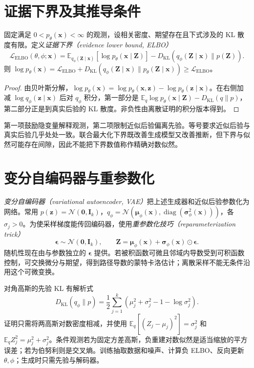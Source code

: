 \section{证据下界及其推导条件}
\begin{proposition}[ELBO 分解]
固定满足 $0<p_\theta(\mathbf x)<\infty$ 的观测，设相关密度、期望存在且下式涉及的 KL 散度有限。定义\emph{证据下界（evidence lower bound, ELBO）}
\begin{equation}
\mathcal L_{\mathrm{ELBO}}(\theta,\phi;\mathbf x)
=\mathbb E_{q_\phi(\mathbf Z\mid\mathbf x)}[\log p_\theta(\mathbf x\mid\mathbf Z)]
-D_{\mathrm{KL}}(q_\phi(\mathbf Z\mid\mathbf x)\|p(\mathbf Z)).
\label{eq:dl-elbo}
\end{equation}
则 $\log p_\theta(\mathbf x)=\mathcal L_{\mathrm{ELBO}}+D_{\mathrm{KL}}(q_\phi(\mathbf Z\mid\mathbf x)\|p_\theta(\mathbf Z\mid\mathbf x))\geq\mathcal L_{\mathrm{ELBO}}$。
\end{proposition}
\begin{proof}
由贝叶斯分解，$\log p_\theta(\mathbf x)=\log p_\theta(\mathbf x,\mathbf z)-\log p_\theta(\mathbf z\mid\mathbf x)$。在右侧加减 $\log q_\phi(\mathbf z\mid\mathbf x)$ 后对 $q_\phi$ 积分，第一部分是 $\mathbb E_q\log p_\theta(\mathbf x\mid\mathbf Z)-D_{\mathrm{KL}}(q\|p)$，第二部分正是到真实后验的 KL 散度。非负性由离散证明的积分版本得到。
\end{proof}
第一项鼓励隐变量解释观测，第二项限制近似后验偏离先验。等号要求近似后验与真实后验几乎处处一致。联合最大化下界既改善生成模型又改善推断，但下界与似然可能存在间隙，因此不能把下界数值称作精确对数似然。

\section{变分自编码器与重参数化}
\emph{变分自编码器（variational autoencoder, VAE）}把上述生成器和近似后验参数化为网络\cite{kingma2013}。常用 $p(\mathbf z)=\mathcal N(\mathbf0,\mathbf I_k)$，$q_\phi=\mathcal N(\boldsymbol\mu_\phi(\mathbf x),\operatorname{diag}(\boldsymbol\sigma_\phi^2(\mathbf x)))$，各 $\sigma_j>0$。为使采样梯度能传回编码器，使用\emph{重参数化技巧（reparameterization trick）}
\[
\boldsymbol\epsilon\sim\mathcal N(\mathbf0,\mathbf I_k),\qquad
\mathbf Z=\boldsymbol\mu_\phi(\mathbf x)+\boldsymbol\sigma_\phi(\mathbf x)\odot\boldsymbol\epsilon.
\]
随机性现在由与参数独立的 $\boldsymbol\epsilon$ 提供。若被积函数可微且邻域内导数受到可积函数控制，可交换微分与期望，得到路径导数的蒙特卡洛估计；离散采样不能无条件沿用这个可微变换。

对角高斯的先验 KL 有解析式
\begin{equation}
D_{\mathrm{KL}}(q_\phi\|p)=\frac12\sum_{j=1}^k(\mu_j^2+\sigma_j^2-1-\log\sigma_j^2).
\label{eq:dl-gaussian-kl}
\end{equation}
证明只需将两高斯对数密度相减，并使用 $\mathbb E_q[(Z_j-\mu_j)^2]=\sigma_j^2$ 和 $\mathbb E_qZ_j^2=\mu_j^2+\sigma_j^2$。条件观测若为固定方差高斯，负重建对数似然是适当缩放的平方误差；若为伯努利则是交叉熵。训练抽取数据和噪声、计算负 ELBO、反向更新 $\theta,\phi$；生成时只需先验与解码器。

